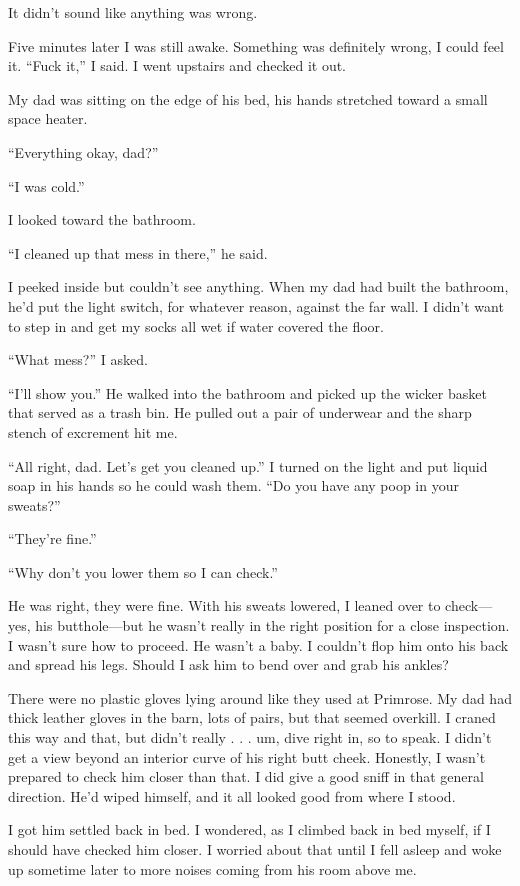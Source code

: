 \documentclass[12pt]{book}
\begin{document}
It didn't sound like anything was wrong.

Five minutes later I was still awake. Something was definitely wrong, I could feel it. ``Fuck it,'' I said. I went upstairs and checked it out.

My dad was sitting on the edge of his bed, his hands stretched toward a small space heater.

``Everything okay, dad?''

``I was cold.''

I looked toward the bathroom.

``I cleaned up that mess in there,'' he said.

I peeked inside but couldn't see anything. When my dad had built the bathroom, he'd put the light switch, for whatever reason, against the far wall. I didn't want to step in and get my socks all wet if water covered the floor.

``What mess?'' I asked.

``I'll show you.'' He walked into the bathroom and picked up the wicker basket that served as a trash bin. He pulled out a pair of underwear and the sharp stench of excrement hit me.

``All right, dad. Let's get you cleaned up.'' I turned on the light and put liquid soap in his hands so he could wash them. ``Do you have any poop in your sweats?''

``They're fine.''

``Why don't you lower them so I can check.''

He was right, they were fine. With his sweats lowered, I leaned over to check---yes, his butthole---but he wasn't really in the right position for a close inspection. I wasn't sure how to proceed. He wasn't a baby. I couldn't flop him onto his back and spread his legs. Should I ask him to bend over and grab his ankles?

There were no plastic gloves lying around like they used at Primrose. My dad had thick leather gloves in the barn, lots of pairs, but that seemed overkill. I craned this way and that, but didn't really . . . um, dive right in, so to speak. I didn't get a view beyond an interior curve of his right butt cheek. Honestly, I wasn't prepared to check him closer than that. I did give a good sniff in that general direction. He'd wiped himself, and it all looked good from where I stood.

I got him settled back in bed. I wondered, as I climbed back in bed myself, if I should have checked him closer. I worried about that until I fell asleep and woke up sometime later to more noises coming from his room above me.
\end{document}
